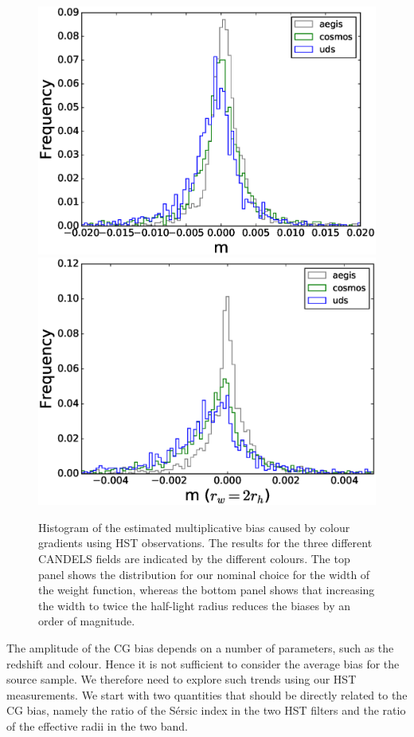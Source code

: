 \documentclass[useAMS,usenatbib]{mnras}
\begin{document}
%
\begin{figure}
  \includegraphics[width=\hsize]{zhiscgb.eps}
  \includegraphics[width=\hsize]{zhiscgbno.eps}
\caption{Histogram of the estimated multiplicative bias caused by colour gradients using HST 
observations. The results for the three different CANDELS fields are indicated by the different
colours. The top panel shows the distribution for our nominal choice for the width of the weight
function, whereas the bottom panel shows that increasing the width to twice the half-light radius
reduces the biases by an order of magnitude. }
\label{fig:cgbhis}
\end{figure}

The amplitude of the CG bias depends on a number of parameters, such as the redshift and colour. Hence it is not sufficient to consider the average bias for the source sample. We therefore need to explore such trends using our HST measurements. We start with two quantities that should be directly related to 
the CG bias, namely the ratio of the S{\'e}rsic index in the two HST filters and the ratio of the effective
radii in the two band. 
\end{document}
